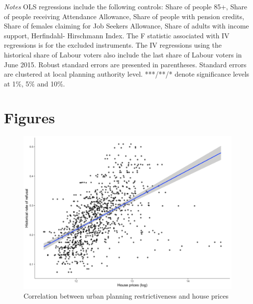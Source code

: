 \documentclass[12pt,letterpaper]{article}
\begin{document}
\begin{table}[h]
{\begin{tabular}{@{}lcccccccccc@{}}
\end{tabular}}
\begin{tablenotes}
      \scriptsize
      \item {\it{Notes}}  OLS regressions include the following controls:
       Share of people 85+, Share of people receiving Attendance Allowance,
        Share of people with pension credits, Share of females claiming for Job Seekers Allowance, 
        Share of adults with income support, Herfindahl- Hirschmann Index. The F statistic associated with IV regressions is for the excluded instruments. 
        The IV regressions using the historical share of Labour voters also include the last share of Labour 
        voters in June 2015. Robust standard errors are presented in parentheses. Standard errors are clustered 
        at local planning authority level. ***/**/* denote significance levels at 1\%, 5\% and 10\%.
    \end{tablenotes}
\end{table}



\newpage


\section{Figures}

\begin{figure}[h!]
\includegraphics[width=1\textwidth]{corr_prices_refusal.png}
\caption{Correlation between urban planning restrictiveness and house prices}
\label{fig: corr_prices_refusal}
\end{figure}
\end{document}
